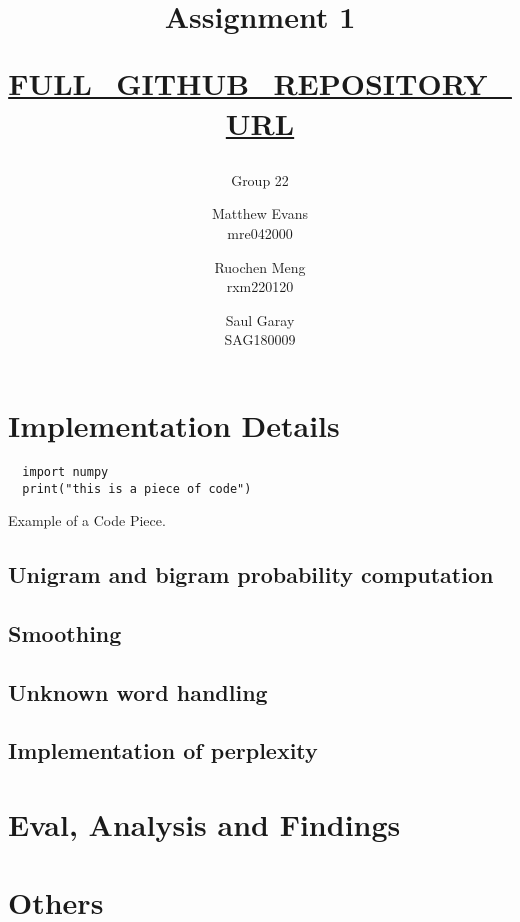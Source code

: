 \documentclass[a4paper]{article}
\title{Assignment 1 \\ \begin{small}\url{FULL_GITHUB_REPOSITORY_URL}\end{small}}
\author{Group 22 \and Matthew Evans \\ mre042000 \and Ruochen Meng \\ rxm220120 \and Saul Garay \\ SAG180009}
\date{}
\begin{document}
\maketitle
% 


\section{Implementation Details}

\begin{listing}[ht]
  \begin{verbatim}
  import numpy  
  print("this is a piece of code")
\end{verbatim}
  \caption{Example of a Code Piece.}
  \label{lst:eg}
\end{listing}

\subsection{Unigram and bigram probability computation}

\subsection{Smoothing}

\subsection{Unknown word handling}

\subsection{Implementation of perplexity}

\section{Eval, Analysis and Findings}

\section{Others}
\end{document}
